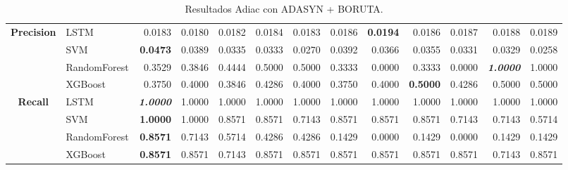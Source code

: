 \begin{table}[H]
\begin{adjustbox}{max width=12cm}
\begin{tabular}{|c|l|r|r|r|r|r|r|r|r|r|r|r|}
			\hline
			\textbf{Precision} &  LSTM &  0.0183 &  0.0180 &  0.0182 &  0.0184 &  0.0183 &  0.0186 & \textbf{  0.0194 } &  0.0186 &  0.0187 &  0.0188 &  0.0189 \\
			&  SVM & \textbf{  0.0473 } &  0.0389 &  0.0335 &  0.0333 &  0.0270 &  0.0392 &  0.0366 &  0.0355 &  0.0331 &  0.0329 &  0.0258 \\
			&  RandomForest &  0.3529 &  0.3846 &  0.4444 &  0.5000 &  0.5000 &  0.3333 &  0.0000 &  0.3333 &  0.0000 & \textit{ \textbf{  1.0000 } } &  1.0000 \\
			&  XGBoost &  0.3750 &  0.4000 &  0.3846 &  0.4286 &  0.4000 &  0.3750 &  0.4000 & \textbf{  0.5000 } &  0.4286 &  0.5000 &  0.5000 \\
			\hline
			\textbf{Recall} &  LSTM & \textit{ \textbf{  1.0000 } } &  1.0000 &  1.0000 &  1.0000 &  1.0000 &  1.0000 &  1.0000 &  1.0000 &  1.0000 &  1.0000 &  1.0000 \\
			&  SVM & \textbf{  1.0000 } &  1.0000 &  0.8571 &  0.8571 &  0.7143 &  0.8571 &  0.8571 &  0.8571 &  0.7143 &  0.7143 &  0.5714 \\
			&  RandomForest & \textbf{  0.8571 } &  0.7143 &  0.5714 &  0.4286 &  0.4286 &  0.1429 &  0.0000 &  0.1429 &  0.0000 &  0.1429 &  0.1429 \\
			&  XGBoost & \textbf{  0.8571 } &  0.8571 &  0.7143 &  0.8571 &  0.8571 &  0.8571 &  0.8571 &  0.8571 &  0.8571 &  0.7143 &  0.8571 \\
			\hline
		\end{tabular}
	\end{adjustbox}
	\caption{Resultados Adiac con ADASYN + BORUTA.}
	\label{tab:Adiac_ADASYN_BORUTA}
\end{table}

